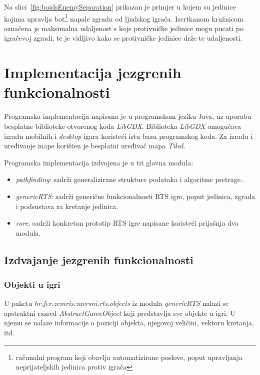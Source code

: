 \documentclass[times, utf8, zavrsni, numeric]{fer}
\begin{document}
\par Na slici~\ref{fig:boidsEnemySeparation} prikazan je primjer u kojem su jedinice kojima upravlja bot\footnote{računalni program koji obavlja automatizirane poslove, poput upravljanja neprijateljskih jedinica protiv igrača} napale zgradu od ljudskog igrača.
Iscrtkanom kružnicom označena je maksimalna udaljenost s koje protivničke jedinice mogu pucati po igračevoj zgradi, te je vidljivo kako se protivničke jedinice drže te udaljenosti.

\chapter{Implementacija jezgrenih funkcionalnosti}\label{ch:implementation}

\par Programska implementacija napisana je u programskom jeziku Java, uz uporabu besplatne biblioteke otvorenog koda \textit{LibGDX}.
Biblioteka \textit{LibGDX} omogućava izradu mobilnih i \textit{desktop} igara koristeći istu bazu programskog koda. 
Za izradu i uređivanje mape korišten je besplatni uređivač mapa \textit{Tiled}.

\par Programska implementacija izdvojena je u tri glavna modula:
\begin{itemize}
	\item \textit{pathfinding}: sadrži generalizirane strukture podataka i algoritme pretrage.
	\item \textit{genericRTS}: sadrži generične funkcionalnosti RTS igre, poput jedinica, zgrada i podsustava za kretanje jedinica.
	\item \textit{core}: sadrži konkretan prototip RTS igre napisane koristeći prijašnja dva modula.
\end{itemize}

\section{Izdvajanje jezgrenih funkcionalnosti}

\subsection{Objekti u igri}

\par U paketu \textit{hr.fer.zemris.zavrsni.rts.objects} iz modula \textit{genericRTS} nalazi se apstraktni razred \textit{AbstractGameObject} koji predstavlja sve objekte u igri.
U njemu se nalaze informacije o poziciji objekta, njegovoj veličini, vektoru kretanja, itd.
\end{document}
